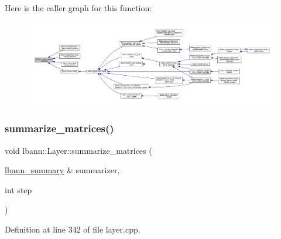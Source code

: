 Here is the caller graph for this function\+:\nopagebreak
\begin{figure}[H]
\begin{center}
\leavevmode
\includegraphics[width=350pt]{classlbann_1_1Layer_a71b7a62afd9b73c23b2c0267b8ba0981_icgraph}
\end{center}
\end{figure}
\mbox{\label{classlbann_1_1Layer_af7e50932bb60d4cab3b21ab3fb0707ea}} 
\subsubsection{\texorpdfstring{summarize\+\_\+matrices()}{summarize\_matrices()}}
{\footnotesize\ttfamily void lbann\+::\+Layer\+::summarize\+\_\+matrices (\begin{DoxyParamCaption}\item[{\hyperlink{classlbann_1_1lbann__summary}{lbann\+\_\+summary} \&}]{summarizer,  }\item[{int}]{step }\end{DoxyParamCaption})\hspace{0.3cm}{\ttfamily [virtual]}}



Definition at line 342 of file layer.\+cpp.


